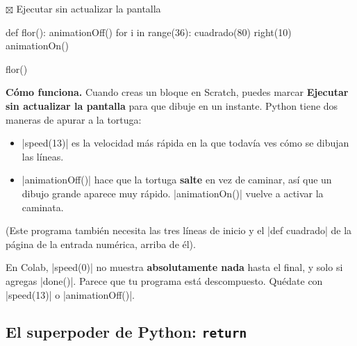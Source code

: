 \begin{tcbraster}[raster columns=2, raster equal height=rows, raster column skip=12pt, raster valign=center, raster force size=false, raster column 1/.style={add to width=-2cm}, raster column 2/.style={add to width=2cm}]
\begin{tcolorbox}[colback=white, colframe=white, boxrule=0pt, valign=center]
\begin{scratch}
\end{scratch}
\par\smallskip
{\small $\boxtimes$ Ejecutar sin actualizar la pantalla}
\end{tcolorbox}
\begin{code}
def flor():
    animationOff()
    for i in range(36):
        cuadrado(80)
        right(10)
    animationOn()

flor()
\end{code}
\end{tcbraster}

\textbf{Cómo funciona.} Cuando creas un bloque en Scratch, puedes marcar \textbf{Ejecutar sin actualizar la pantalla} para que dibuje en un instante. Python tiene dos maneras de apurar a la tortuga:
\begin{itemize}
  \item \py|speed(13)| es la velocidad más rápida en la que todavía ves cómo se dibujan las líneas.
  \item \py|animationOff()| hace que la tortuga \textbf{salte} en vez de caminar, así que un dibujo grande aparece muy rápido. \py|animationOn()| vuelve a activar la caminata.
\end{itemize}
(Este programa también necesita las tres líneas de inicio y el \py|def cuadrado| de la página de la entrada numérica, arriba de él).

\begin{watchout}
En Colab, \py|speed(0)| no muestra \textbf{absolutamente nada} hasta el final, y solo si agregas \py|done()|. Parece que tu programa está descompuesto. Quédate con \py|speed(13)| o \py|animationOff()|.
\end{watchout}

\subsection*{El superpoder de Python: \texttt{return}}

